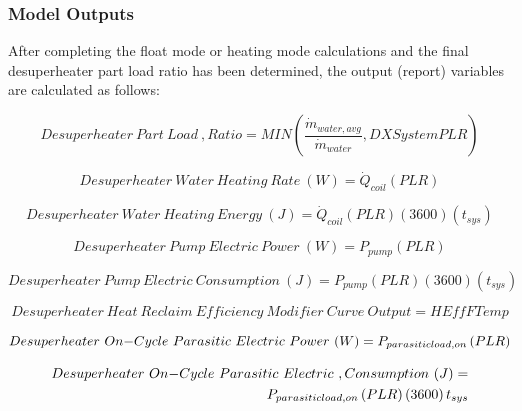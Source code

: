 \subsubsection{Model Outputs}\label{model-outputs}

After completing the float mode or heating mode calculations and the final desuperheater part load ratio has been determined, the output (report) variables are calculated as follows:

\begin{equation}
Desuperheater~Part~Load~,Ratio = MIN\left( {\frac{{\dot{m}_{water,avg}}}{{\dot{m}_{water}}},DXSystemPLR} \right)
\end{equation}

\begin{equation}
Desuperheater~Water~Heating~Rate~(W) = {\dot Q_{coil}}\left( {PLR} \right)
\end{equation}

\begin{equation}
Desuperheater~Water~Heating~Energy~(J) = {\dot Q_{coil}}\left( {PLR} \right)(3600)\left( {{t_{sys}}} \right)
\end{equation}

\begin{equation}
Desuperheater~Pump~Electric~Power~(W) = {P_{pump}}\left( {PLR} \right)
\end{equation}

\begin{equation}
Desuperheater~Pump~Electric~Consumption~(J) = {P_{pump}}\left( {PLR} \right)\left( {3600} \right)\left( {{t_{sys}}} \right)
\end{equation}

\begin{equation}
Desuperheater~Heat~Reclaim~Efficiency~Modifier~Curve~Output = HEffFTemp
\end{equation}

\begin{equation}
Desuperheater~On{\rm{ - }}Cycle~Parasitic~Electric~Power~(W) = {P_{parasiticload,on}}\left( {PLR} \right)
\end{equation}

\begin{equation}
\begin{split}
Desuperheater~On{\rm{ - }}Cycle~Parasitic~Electric~,Consumption~(J) = \\{P_{parasiticload,on}}\left( {PLR} \right)\left( {3600} \right){t_{sys}}
\end{split}
\end{equation}

